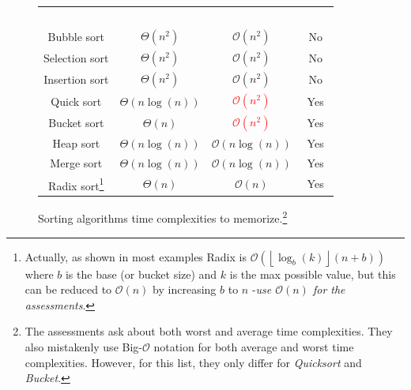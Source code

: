 \documentclass{exam}
\begin{document}
\vspace{-.4cm}
\begin{figure}[H]
    \begin{myThm}
        \centering
            \begin{tabular}{cccc}
                \rowcolor{blueWGU!50}
                \textcolor{white}{Sort function} & 
                \textcolor{white}{Average/Typical} &
                \textcolor{white}{Big-$\mathcal{O}$/worst} &
                \textcolor{white}{Fast?}\\
                Bubble sort & $\Theta(n^{2})$ & $\mathcal{O}(n^{2})$ & No\\
                Selection sort & $\Theta(n^{2})$ & $\mathcal{O}(n^{2})$ & No\\
                Insertion sort & $\Theta(n^{2})$ & $\mathcal{O}(n^{2})$ & No\\
                Quick sort & $\Theta(n\log(n))$ & \textcolor{red}{$\mathcal{O}(n^{2})$} & Yes\\
                Bucket sort & $\Theta(n)$ & \textcolor{red}{$\mathcal{O}(n^{2})$} & Yes\\
                Heap sort & $\Theta(n\log(n))$ & $\mathcal{O}(n\log(n))$ & Yes\\
                Merge sort & $\Theta(n\log(n))$ & $\mathcal{O}(n\log(n))$ & Yes\\
                Radix sort\footnote{Actually, as shown in most examples Radix is $\mathcal{O}(\left \lfloor\log_{b}(k) \right \rfloor (n+b))$ where $b$ is the base (or bucket size) and $k$ is the max possible value, but this can be reduced to $\mathcal{O}(n)$ by increasing $b$ to $n$ -\emph{use $\mathcal{O}(n)$ for the assessments}.} & $\Theta(n)$ & $\mathcal{O}(n)$ & Yes 
            \end{tabular}
        \caption*{Sorting algorithms time complexities to memorize.\footnote{The assessments ask about both worst and average time complexities. They also mistakenly use Big-$\mathcal{O}$ notation for both average and worst time complexities. However, for this list, they  only differ for \textit{Quicksort} and \textit{Bucket}.}}
    \end{myThm}
\end{figure}
\end{document}
